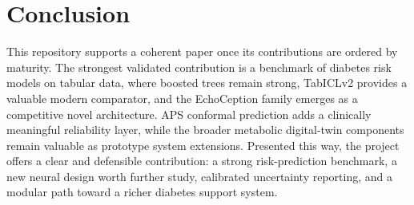 \documentclass[conference]{IEEEtran}
\begin{document}
\section{Conclusion}
This repository supports a coherent paper once its contributions are ordered by maturity. The strongest validated contribution is a benchmark of diabetes risk models on tabular data, where boosted trees remain strong, TabICLv2 provides a valuable modern comparator, and the EchoCeption family emerges as a competitive novel architecture. APS conformal prediction adds a clinically meaningful reliability layer, while the broader metabolic digital-twin components remain valuable as prototype system extensions. Presented this way, the project offers a clear and defensible contribution: a strong risk-prediction benchmark, a new neural design worth further study, calibrated uncertainty reporting, and a modular path toward a richer diabetes support system.
\end{document}
